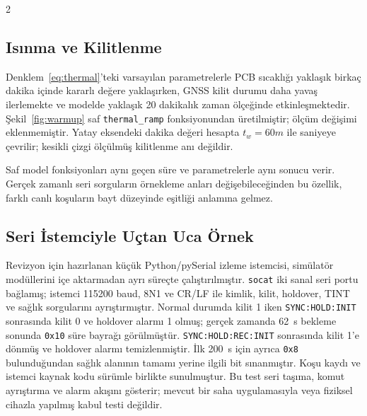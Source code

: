 \documentclass[9pt,twocolumn,a4paper]{extarticle}
\begin{document}
\onecolumn
\begin{multicols}{2}
\subsection{Isınma ve Kilitlenme}
Denklem~\ref{eq:thermal}'teki varsayılan parametrelerle PCB sıcaklığı yaklaşık birkaç dakika içinde kararlı değere yaklaşırken, GNSS kilit durumu daha yavaş ilerlemekte ve modelde yaklaşık 20 dakikalık zaman ölçeğinde etkinleşmektedir. Şekil~\ref{fig:warmup} saf \texttt{thermal\_ramp} fonksiyonundan üretilmiştir; ölçüm değişimi eklenmemiştir. Yatay eksendeki dakika değeri hesapta $t_w=60m$ ile saniyeye çevrilir; kesikli çizgi ölçülmüş kilitlenme anı değildir.

\begin{center}
\begin{minipage}{\columnwidth}
\centering
{}
\label{fig:warmup}
\end{minipage}
\end{center}

Saf model fonksiyonları aynı geçen süre ve parametrelerle aynı sonucu verir. Gerçek zamanlı seri sorguların örnekleme anları değişebileceğinden bu özellik, farklı canlı koşuların bayt düzeyinde eşitliği anlamına gelmez.

\subsection{Seri İstemciyle Uçtan Uca Örnek}
Revizyon için hazırlanan küçük Python/pySerial izleme istemcisi, simülatör modüllerini içe aktarmadan ayrı süreçte çalıştırılmıştır. \texttt{socat} iki sanal seri portu bağlamış; istemci 115200 baud, 8N1 ve CR/LF ile kimlik, kilit, holdover, TINT ve sağlık sorgularını ayrıştırmıştır. Normal durumda kilit 1 iken \texttt{SYNC:HOLD:INIT} sonrasında kilit 0 ve holdover alarmı 1 olmuş; gerçek zamanda 62~s bekleme sonunda \texttt{0x10} süre bayrağı görülmüştür. \texttt{SYNC:HOLD:REC:INIT} sonrasında kilit 1'e dönmüş ve holdover alarmı temizlenmiştir. İlk 200~s için ayrıca \texttt{0x8} bulunduğundan sağlık alanının tamamı yerine ilgili bit sınanmıştır. Koşu kaydı ve istemci kaynak kodu sürümle birlikte sunulmuştur. Bu test seri taşıma, komut ayrıştırma ve alarm akışını gösterir; mevcut bir saha uygulamasıyla veya fiziksel cihazla yapılmış kabul testi değildir.


\end{multicols}
\end{document}
